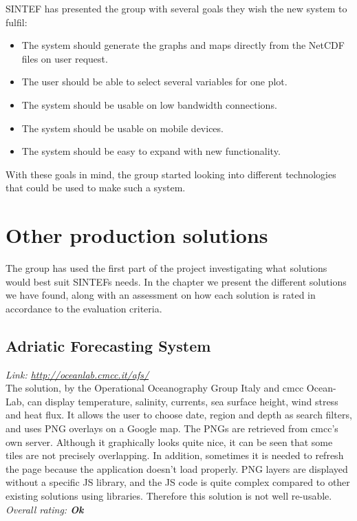 \documentclass[11pt,a4paper,titlepage,oneside]{report}
\begin{document}
SINTEF has presented the group with several goals they wish the new system to fulfil:

\begin{itemize}
\item The system should generate the graphs and maps directly from the NetCDF files on user request.
\item The user should be able to select several variables for one plot.
\item The system should be usable on low bandwidth connections.
\item The system should be usable on mobile devices.
\item The system should be easy to expand with new functionality.
\end{itemize} 

With these goals in mind, the group started looking into different technologies that could be used to make such a system.

\section{Other production solutions}
The group has used the first part of the project investigating what solutions would best suit SINTEFs needs. In the chapter we present the different solutions we have found, along with an assessment on how each solution is rated in accordance to the evaluation criteria. 

\subsection{Adriatic Forecasting System}
\emph{Link: \url{http://oceanlab.cmcc.it/afs/}} \\%
  The solution, by the Operational Oceanography Group Italy and cmcc Ocean-Lab, can display temperature, salinity, currents, sea surface height, wind stress and heat flux. It allows the user to choose date, region and depth as search filters, and uses PNG overlays on a Google map. The PNGs are retrieved from cmcc's own server.
  Although it graphically looks quite nice, it can be seen that some tiles are not precisely overlapping. In addition, sometimes it is needed to refresh the page because the application doesn't load properly. PNG layers are displayed without a specific JS library, and the JS code is quite complex compared to other existing solutions using libraries. Therefore this solution is not well re-usable.
\\ \emph{Overall rating: \textbf{Ok}}
\end{document}
